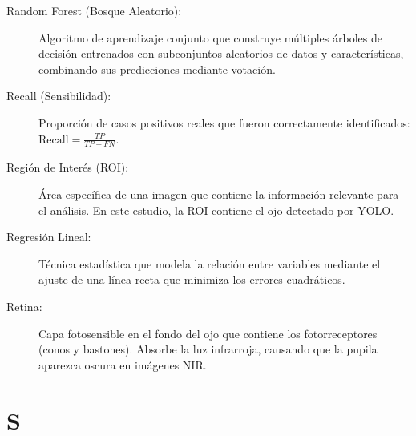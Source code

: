 \begin{description}
    \item[Random Forest (Bosque Aleatorio):] Algoritmo de aprendizaje conjunto que construye múltiples árboles de decisión entrenados con subconjuntos aleatorios de datos y características, combinando sus predicciones mediante votación.
    
    \item[Recall (Sensibilidad):] Proporción de casos positivos reales que fueron correctamente identificados: $\text{Recall} = \frac{TP}{TP + FN}$.
    
    \item[Región de Interés (ROI):] Área específica de una imagen que contiene la información relevante para el análisis. En este estudio, la ROI contiene el ojo detectado por YOLO.
    
    \item[Regresión Lineal:] Técnica estadística que modela la relación entre variables mediante el ajuste de una línea recta que minimiza los errores cuadráticos.
    
    \item[Retina:] Capa fotosensible en el fondo del ojo que contiene los fotorreceptores (conos y bastones). Absorbe la luz infrarroja, causando que la pupila aparezca oscura en imágenes NIR.
\end{description}

\section*{S}

